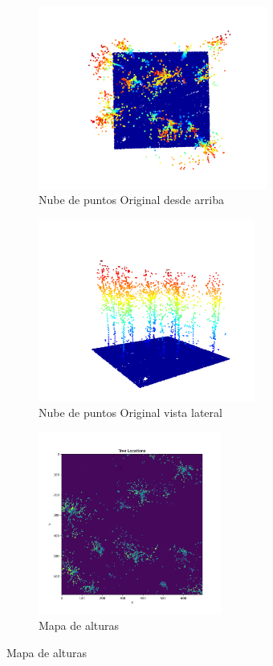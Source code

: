 \begin{figure}[h]
\centering
\begin{subfigure}[t]{.4\textwidth}
  \centering
  \includegraphics[height=6cm]{imaxes/slice_sup.png}
  \caption{Nube de puntos Original desde arriba}
  \label{fig:slice_top}
\end{subfigure}
\begin{subfigure}[t]{.4\textwidth}
  \centering
  \includegraphics[height=6cm]{imaxes/slice_lat.png}
  \caption{Nube de puntos Original vista lateral}
  \label{fig:slice_lat}
\end{subfigure}
\begin{subfigure}[t]{.4\textwidth}
  \centering
  \includegraphics[height=6cm]{imaxes/chm.png}
  \caption{Mapa de alturas}
  \label{fig:chm}
\end{subfigure}%

\end{figure}
